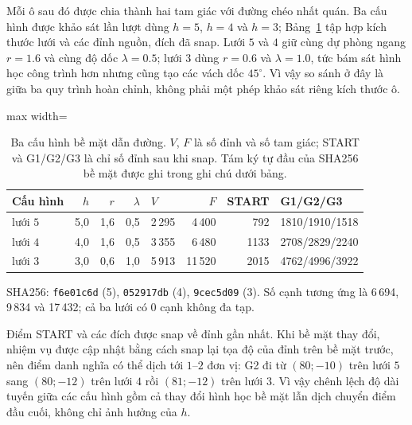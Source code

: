 Mỗi ô sau đó được chia thành hai tam giác với đường chéo nhất quán. Ba cấu hình
được khảo sát lần lượt dùng $h=5$, $h=4$ và $h=3$; Bảng~\ref{tab:surfaces} tập
hợp kích thước lưới và các đỉnh nguồn, đích đã snap. Lưới $5$ và $4$ giữ cùng dự
phòng ngang $r=\num{1.6}$ và cùng độ dốc $\lambda=\num{0.5}$; lưới $3$ dùng
$r=\num{0.6}$ và $\lambda=\num{1.0}$, tức bám sát hình học công trình hơn nhưng
cũng tạo các vách dốc $45^\circ$. Vì vậy so sánh ở đây là giữa ba quy trình hoàn
chỉnh, không phải một phép khảo sát riêng kích thước ô.

\begin{table}[!t]
  \caption{Ba cấu hình bề mặt dẫn đường. $V$, $F$ là số đỉnh và số tam giác; START
    và G1/G2/G3 là chỉ số đỉnh sau khi snap. Tám ký tự đầu của SHA256 bề mặt được
    ghi trong ghi chú dưới bảng.}
  \label{tab:surfaces}
  {\fontsize{7}{8.6}\selectfont
  \begin{adjustbox}{max width=\textwidth}
  \begin{tabular}{@{}lrrrlrrl@{}}
    \toprule
    Cấu hình & $h$ & $r$ & $\lambda$ & $V$ & $F$ & START & G1/G2/G3 \\
    \midrule
    lưới $5$ & 5,0 & 1,6 & 0,5 & 2\,295 & 4\,400 & 792  & 1810/1910/1518 \\
    lưới $4$ & 4,0 & 1,6 & 0,5 & 3\,355 & 6\,480 & 1133 & 2708/2829/2240 \\
    lưới $3$ & 3,0 & 0,6 & 1,0 & 5\,913 & 11\,520 & 2015 & 4762/4996/3922 \\
    \bottomrule
  \end{tabular}
  \end{adjustbox}}
  \par\smallskip
  {\footnotesize SHA256: \texttt{f6e01c6d} (5), \texttt{052917db} (4),
  \texttt{9cec5d09} (3). Số cạnh tương ứng là 6\,694, 9\,834 và 17\,432; cả ba
  lưới có 0 cạnh không đa tạp.}
\end{table}

Điểm START và các đích được snap về đỉnh gần nhất. Khi bề mặt thay đổi, nhiệm vụ
được cập nhật bằng cách snap lại tọa độ của đỉnh trên bề mặt trước, nên điểm danh
nghĩa có thể dịch tới $1$--$2$ đơn vị: G2 đi từ $(80;-10)$ trên lưới $5$ sang
$(80;-12)$ trên lưới $4$ rồi $(81;-12)$ trên lưới $3$. Vì vậy chênh lệch độ dài
tuyến giữa các cấu hình gồm cả thay đổi hình học bề mặt lẫn dịch chuyển điểm đầu
cuối, không chỉ ảnh hưởng của $h$.

